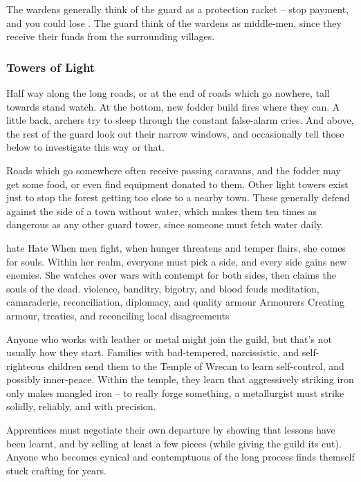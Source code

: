 \begin{multicols}{2}
The wardens generally think of the \gls{guard} as a protection racket -- stop payment, and you could lose .
The \gls{guard} think of the wardens as middle-men, since they receive their funds from the surrounding \glspl{village}.

\subsubsection{Towers of Light}
Half way along the long roads, or at the end of roads which go nowhere, tall towards stand watch.
At the bottom, new fodder build fires where they can.
A little back, archers try to sleep through the constant false-alarm cries.
And above, the rest of the guard look out their narrow windows, and occasionally tell those below to investigate this way or that.

Roads which go somewhere often receive passing caravans, and the fodder may get some food, or even find equipment donated to them.
Other light towers exist just to stop the forest getting too close to a nearby town.
These generally defend against the side of a town without water, which makes them ten times as dangerous as any other \gls{guard} tower, since someone must fetch water daily.

  {\gls{hate}}%
  {Hate}%
  {When men fight, when hunger threatens and temper flairs, she comes for souls.
  Within her realm, everyone must pick a side, and every side gains new enemies.
  She watches over wars with contempt for both sides, then claims the souls of the dead.}%
  {violence, banditry, bigotry, and blood feuds}%
  {meditation, camaraderie, reconciliation, diplomacy, and quality armour}%
  {Armourers}%
  {Creating armour, treaties, and reconciling local disagreements}%

Anyone who works with leather or metal might join the guild, but that's not usually how they start.
Families with bad-tempered, narcissistic, and self-righteous children send them to the Temple of Wrecan to learn self-control, and possibly inner-peace.
Within the temple, they learn that aggressively striking iron only makes mangled iron -- to really forge something, a metallurgist must strike solidly, reliably, and with precision.

Apprentices must negotiate their own departure by showing that lessons have been learnt, and by selling at least a few pieces (while giving the guild its cut).
Anyone who becomes cynical and contemptuous of the long process finds themself stuck crafting for years.


\end{multicols}
